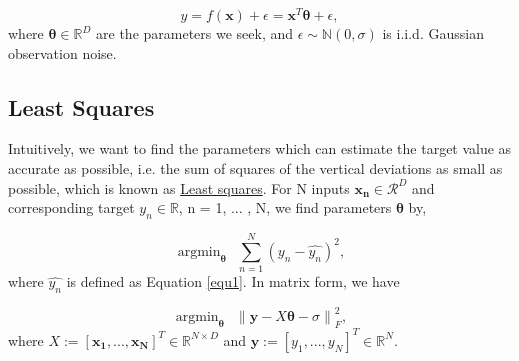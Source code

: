 \documentclass[11pt,a4paper]{article}
\begin{document}
\begin{equation}
\label{equ1}
\hat{y} = f(\bm{x}) + \epsilon = \bm{x}^T \bm{\theta} + \epsilon,
\end{equation}
where  $\bm{\theta} \in \mathbb{R}^D$ are the parameters we seek, and $\epsilon \sim \mathbb{N}(0, \sigma)$ is i.i.d. Gaussian observation noise. %

\subsection{Least Squares}

Intuitively, we want to find the parameters which can estimate the target value as accurate as possible, i.e. the sum of squares of the vertical deviations as small as possible, which is known as   \href{https://en.wikipedia.org/wiki/Least_squares}{Least squares}. For N inputs $\bm{x_n} \in \mathcal{R}^D$ and corresponding target $y_n \in \mathbb{R}$, n = 1, ... , N, we find parameters $\bm{\theta}$ by,

\begin{equation}
\label{equ2}
\mathop{\arg\min}_{\bm{\theta}} \ \ \sum_{n=1}^N (y_n - \hat{y_n})^2,
\end{equation}
where $\hat{y_n}$ is defined as Equation \ref{equ1}. In matrix form, we have

\begin{equation}
\mathop{\arg\min}_{\bm{\theta}} {\ \  \| \bm{y} - X \bm{\theta} - \sigma\|}_{F}^2,
\end{equation}
where $X := [\bm{x_1, ..., x_N}]^T \in \mathbb{R} ^{N \times D}$ and $\bm{y} := [y_1, ... , y_N]^T \in \mathbb{R}^N$.





\end{document}
